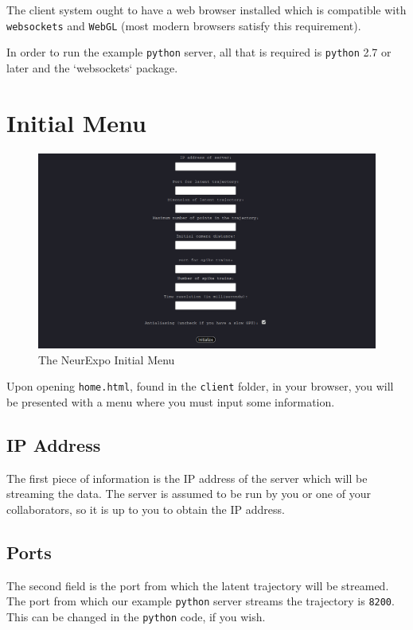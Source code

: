 \documentclass[12pt, openany]{book}
\begin{document}
The client system ought to have a web browser installed which is compatible with \texttt{websockets} and \texttt{WebGL} (most modern browsers satisfy this requirement).

In order to run the example \texttt{python} server, all that is required is \texttt{python} 2.7 or later and the `websockets` package.

\chapter{Initial Menu}

\begin{figure}
  \includegraphics[width=\linewidth]{NeurExpo_Menu.png}
  \caption{The NeurExpo Initial Menu}
 \end{figure}

Upon opening \texttt{home.html}, found in the \texttt{client} folder, in your browser, you will be presented with a menu where you must input some information.

\section{IP Address}

The first piece of information is the IP address of the server which will be streaming the data. The server is assumed to be run by you or one of your collaborators, so it is up to you to obtain the IP address.

\section{Ports}

The second field is the port from which the latent trajectory will be streamed. The port from which our example \texttt{python} server streams the trajectory is \texttt{8200}. This can be changed in the \texttt{python} code, if you wish.
\end{document}
